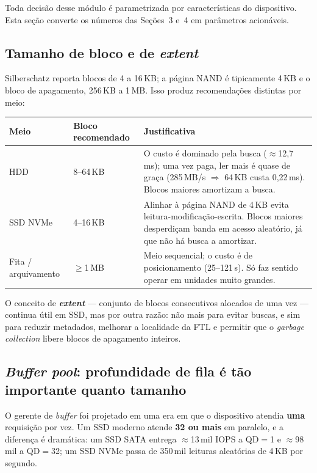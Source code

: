 \documentclass[11pt,a4paper]{article}
\begin{document}
Toda decisão desse módulo é parametrizada por características do dispositivo. Esta seção
converte os números das Seções~3 e~4 em parâmetros acionáveis.

\subsection{Tamanho de bloco e de \emph{extent}}

Silberschatz reporta blocos de 4 a 16\,KB; a página NAND é tipicamente 4\,KB e o bloco de
apagamento, 256\,KB a 1\,MB. Isso produz recomendações distintas por meio:

\begin{center}\small
\begin{tabular}{@{}p{3.0cm}p{2.6cm}p{9.4cm}@{}}
\toprule
\textbf{Meio} & \textbf{Bloco recomendado} & \textbf{Justificativa} \\
\midrule
HDD & 8--64\,KB & O custo é dominado pela busca ($\approx$12,7\,ms); uma vez paga, ler mais é quase de graça (285\,MB/s $\Rightarrow$ 64\,KB custa 0,22\,ms). Blocos maiores amortizam a busca. \\
SSD NVMe & 4--16\,KB & Alinhar à página NAND de 4\,KB evita leitura-modificação-escrita. Blocos maiores desperdiçam banda em acesso aleatório, já que não há busca a amortizar. \\
Fita / arquivamento & $\ge$1\,MB & Meio sequencial; o custo é de posicionamento (25--121\,s). Só faz sentido operar em unidades muito grandes. \\
\bottomrule
\end{tabular}
\end{center}

O conceito de \textbf{\emph{extent}} --- conjunto de blocos consecutivos alocados de uma vez
--- continua útil em SSD, mas por outra razão: não mais para evitar buscas, e sim para
reduzir metadados, melhorar a localidade da FTL e permitir que o \emph{garbage collection}
libere blocos de apagamento inteiros.

\subsection{\emph{Buffer pool}: profundidade de fila é tão importante quanto tamanho}

O gerente de \emph{buffer} foi projetado em uma era em que o dispositivo atendia
\textbf{uma} requisição por vez. Um SSD moderno atende \textbf{32 ou mais} em paralelo, e a
diferença é dramática: um SSD SATA entrega $\approx$13\,mil IOPS a QD$=$1 e $\approx$98\,mil
a QD$=$32; um SSD NVMe passa de 350\,mil leituras aleatórias de 4\,KB por segundo.
\end{document}

